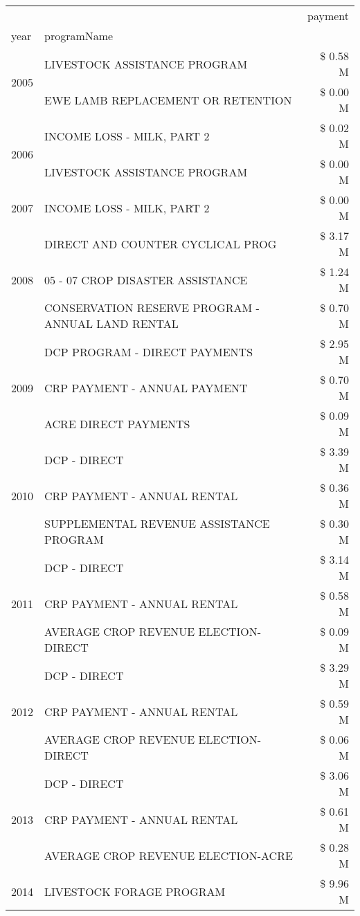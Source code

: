 \begin{tabular}{llr}
\toprule
 &  & payment \\
year & programName &  \\
\midrule
\multirow[t]{2}{*}{2005} & LIVESTOCK ASSISTANCE PROGRAM & \$ 0.58 M \\
 & EWE LAMB REPLACEMENT OR RETENTION & \$ 0.00 M \\
\cline{1-3}
\multirow[t]{2}{*}{2006} & INCOME LOSS - MILK, PART 2 & \$ 0.02 M \\
 & LIVESTOCK ASSISTANCE PROGRAM & \$ 0.00 M \\
\cline{1-3}
2007 & INCOME LOSS - MILK, PART 2 & \$ 0.00 M \\
\cline{1-3}
\multirow[t]{3}{*}{2008} & DIRECT AND COUNTER CYCLICAL PROG & \$ 3.17 M \\
 & 05 - 07 CROP DISASTER ASSISTANCE & \$ 1.24 M \\
 & CONSERVATION RESERVE PROGRAM - ANNUAL LAND RENTAL & \$ 0.70 M \\
\cline{1-3}
\multirow[t]{3}{*}{2009} & DCP PROGRAM - DIRECT PAYMENTS & \$ 2.95 M \\
 & CRP PAYMENT - ANNUAL PAYMENT & \$ 0.70 M \\
 & ACRE DIRECT PAYMENTS & \$ 0.09 M \\
\cline{1-3}
\multirow[t]{3}{*}{2010} & DCP - DIRECT & \$ 3.39 M \\
 & CRP PAYMENT - ANNUAL RENTAL & \$ 0.36 M \\
 & SUPPLEMENTAL REVENUE ASSISTANCE PROGRAM & \$ 0.30 M \\
\cline{1-3}
\multirow[t]{3}{*}{2011} & DCP - DIRECT & \$ 3.14 M \\
 & CRP PAYMENT - ANNUAL RENTAL & \$ 0.58 M \\
 & AVERAGE CROP REVENUE ELECTION-DIRECT & \$ 0.09 M \\
\cline{1-3}
\multirow[t]{3}{*}{2012} & DCP - DIRECT & \$ 3.29 M \\
 & CRP PAYMENT - ANNUAL RENTAL & \$ 0.59 M \\
 & AVERAGE CROP REVENUE ELECTION-DIRECT & \$ 0.06 M \\
\cline{1-3}
\multirow[t]{3}{*}{2013} & DCP - DIRECT & \$ 3.06 M \\
 & CRP PAYMENT - ANNUAL RENTAL & \$ 0.61 M \\
 & AVERAGE CROP REVENUE ELECTION-ACRE & \$ 0.28 M \\
\cline{1-3}
\multirow[t]{3}{*}{2014} & LIVESTOCK FORAGE PROGRAM & \$ 9.96 M \\

\end{tabular}
